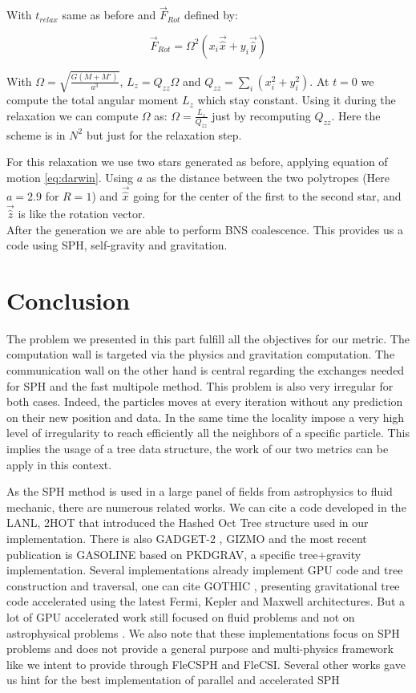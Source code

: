 With $t_{relax}$ same as before and $\vec{F}_{Rot}$ defined by:

\begin{equation}
\vec{F}_{Rot} = \Omega^2(x_i \vec{\hat{x}}+y_i\vec{\hat{y}})
\end{equation}

With $\Omega = \sqrt{\frac{G(M+M')}{a^3}}$, $L_z = Q_{zz}\Omega$ and $Q_{zz} = \sum_i(x_i^2+y_i^2)$. At $t=0$ we compute the total angular moment $L_z$ which stay constant.
Using it during the relaxation we can compute $\Omega$ as: $\Omega = \frac{L_z}{Q_{zz}}$ just by recomputing $Q_{zz}$.
Here the scheme is in $N^2$ but just for the relaxation step. 

For this relaxation we use two stars generated as before, applying equation of motion \ref{eq:darwin}.
Using $a$ as the distance between the two polytropes  (Here $a=2.9$ for $R=1$) and $\vec{\hat{x}}$ going for the center of the first to the second star, and $\vec{\hat{z}}$ is like the rotation vector.\\

After the generation we are able to perform BNS coalescence. 
This provides us a code using SPH, self-gravity and gravitation. 

\section{Conclusion}
The problem we presented in this part fulfill all the objectives for our metric. 
The computation wall is targeted via the physics and gravitation computation. 
The communication wall on the other hand is central regarding the exchanges needed for SPH and the fast multipole method. 
This problem is also very irregular for both cases. 
Indeed, the particles moves at every iteration without any prediction on their new position and data. 
In the same time the locality impose a very high level of irregularity to reach efficiently all the neighbors of a specific particle. 
This implies the usage of a tree data structure, the work of our two metrics can be apply in this context. 

As the SPH method is used in a large panel of fields from astrophysics to fluid mechanic, there are numerous related works. 
We can cite a code developed in the LANL, 2HOT \cite{warren20132hot} that introduced the Hashed Oct Tree structure used in our implementation. 
There is also GADGET-2 \cite{springel2005cosmological}, GIZMO \cite{hopkins2014gizmo} and the most recent publication is GASOLINE \cite{wadsley2017gasoline2} based on PKDGRAV, a specific tree+gravity implementation. 
Several implementations already implement GPU code and tree construction and traversal, one can cite GOTHIC \cite{miki2017gothic}, presenting gravitational tree code accelerated using the latest Fermi, Kepler and Maxwell architectures. But a lot of GPU accelerated work still focused on fluid problems and not on astrophysical problems  \cite{harada2007smoothed,crespo2011gpus}.
We also note that these implementations focus on SPH problems and does not provide a general purpose and multi-physics framework like we intent to provide through FleCSPH and FleCSI. 
Several other works gave us hint for the best implementation of parallel and accelerated SPH\cite{ihmsen2011parallel,ihmsen2014sph}

